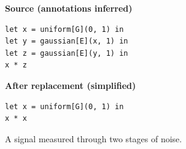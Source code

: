 \begin{figure}[htbp]
\centering
\begin{minipage}[t]{.48\linewidth}
\raggedright\textbf{Source (annotations inferred)}
\begin{lstlisting}[xleftmargin=0pt]
let x = uniform[G](0, 1) in
let y = gaussian[E](x, 1) in
let z = gaussian[E](y, 1) in
x * z
\end{lstlisting}
\end{minipage}\hfill
\begin{minipage}[t]{.48\linewidth}
\raggedright\textbf{After replacement (simplified)}
\begin{lstlisting}[xleftmargin=0pt]
let x = uniform[G](0, 1) in
x * x
\end{lstlisting}
\end{minipage}
\caption{A signal measured through two stages of noise.}
\label{fig:intro-signal}
\end{figure}
